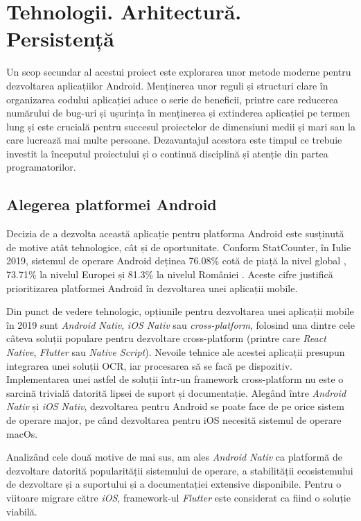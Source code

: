 \chapter{Tehnologii. Arhitectură. Persistență}

Un scop secundar al acestui proiect este explorarea unor metode moderne pentru dezvoltarea aplicațiilor Android. Menținerea unor reguli și structuri clare în organizarea codului aplicației aduce o serie de beneficii, printre care reducerea numărului de bug-uri și ușurința în menținerea și extinderea aplicației pe termen lung și este crucială pentru succesul proiectelor de dimensiuni medii și mari sau la care lucrează mai multe persoane. Dezavantajul acestora este timpul ce trebuie investit la începutul proiectului și o continuă disciplină și atenție din partea programatorilor.

\section{Alegerea platformei Android}

Decizia de a dezvolta această aplicație pentru platforma Android este susținută de motive atât tehnologice, cât și de oportunitate. Conform StatCounter, în Iulie 2019, sistemul de operare Android deținea 76.08\% cotă de piață la nivel global \cite{StatsWorldwide}, 73.71\% la nivelul Europei \cite{StatsEurope} și 81.3\% la nivelul României \cite{StatsRomania}. Aceste cifre justifică prioritizarea platformei Android în dezvoltarea unei aplicații mobile.

Din punct de vedere tehnologic, opțiunile pentru dezvoltarea unei aplicații mobile în 2019 sunt \emph{Android Nativ}, \emph{iOS Nativ} sau \emph{cross-platform}, folosind una dintre cele câteva soluții populare pentru dezvoltare cross-platform (printre care \emph{React Native}, \emph{Flutter} sau \emph{Native Script}). Nevoile tehnice ale acestei aplicații presupun integrarea unei soluții OCR, iar procesarea să se facă pe dispozitiv. Implementarea unei astfel de soluții într-un framework cross-platform nu este o sarcină trivială datorită lipsei de suport și documentație. Alegând între \emph{Android Nativ} și \emph{iOS Nativ}, dezvoltarea pentru Android se poate face de pe orice sistem de operare major, pe când dezvoltarea pentru iOS necesită sistemul de operare macOs. 

Analizând cele două motive de mai sus, am ales \emph{Android Nativ} ca platformă de dezvoltare datorită popularității sistemului de operare, a stabilității ecosistemului de dezvoltare și a suportului și a documentației extensive disponibile. Pentru o viitoare migrare către \emph{iOS}, framework-ul \emph{Flutter} este considerat ca fiind o soluție viabilă.

